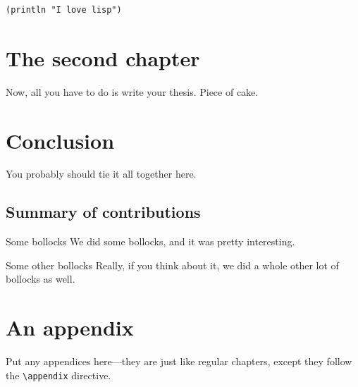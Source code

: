\documentclass[12pt,xetex]{scrbook}
\begin{document}
\begin{onehalfspace}
\begin{verbatim}
(println "I love lisp")
\end{verbatim}



\chapter{The second chapter}
\label{chap:second-chapter}

Now, all you have to do is write your thesis.  Piece of cake.


\chapter{Conclusion}
\label{chap:conclusion}

You probably should tie it all together here.

\section{Summary of contributions}
\label{sec:summary-of-contributions}

\begin{headinglist}
\item[Some bollocks]
  We did some bollocks, and it was pretty interesting.
\item[Some other bollocks]
  Really, if you think about it, we did a whole other lot of bollocks
  as well.
\end{headinglist}


\appendix

\chapter{An appendix}
\label{chap:an-appendix}

Put any appendices here---they are just like regular chapters, except
they follow the \texttt{\textbackslash{}appendix} directive.

\end{onehalfspace}

\backmatter


\printbibliography[title=References,heading=bibintoc]
\end{document}
